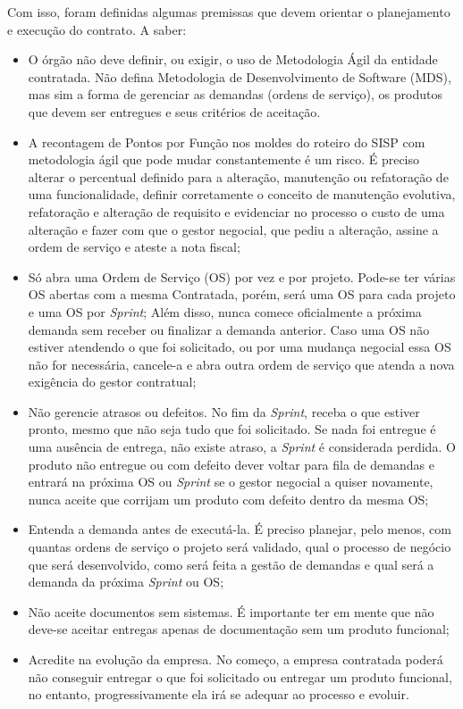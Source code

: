 Com isso, foram definidas algumas premissas que devem orientar o planejamento e execução do contrato. A saber: 
\begin{itemize}
\item O órgão não deve definir, ou exigir, o uso de Metodologia Ágil da entidade contratada. Não defina Metodologia de Desenvolvimento de Software (MDS), mas sim a
forma de gerenciar as demandas (ordens de serviço), os produtos que devem ser entregues e seus critérios de aceitação. 
\item A recontagem de Pontos por Função nos moldes do roteiro do SISP com metodologia ágil que pode mudar constantemente é um risco. É preciso alterar o percentual definido para a alteração, manutenção ou refatoração de uma funcionalidade, definir corretamente o conceito de manutenção evolutiva, refatoração e alteração de requisito e evidenciar no processo o custo de uma alteração e fazer com que o gestor negocial, que pediu a alteração, assine a ordem de serviço e ateste a nota fiscal;
\item Só abra uma Ordem de Serviço (OS) por vez e por projeto. Pode-se ter várias OS abertas com a mesma Contratada, porém, será uma OS para cada projeto e uma OS por \textit{Sprint}; Além disso, nunca comece oficialmente a próxima demanda sem receber ou finalizar a demanda anterior. Caso uma OS não estiver atendendo o que foi solicitado, ou por uma mudança negocial essa OS não for necessária, cancele-a e abra outra ordem de serviço que atenda a nova exigência do gestor contratual;
\item Não gerencie atrasos ou defeitos. No fim da \textit{Sprint}, receba o que estiver pronto, mesmo que não seja tudo que foi solicitado. Se nada foi entregue é uma ausência de entrega, não existe atraso, a \textit{Sprint} é considerada perdida. O produto não entregue ou com defeito dever voltar para fila de demandas e entrará na próxima OS ou \textit{Sprint} se o gestor negocial a quiser novamente, nunca aceite que corrijam um produto com defeito dentro da mesma OS;
\item Entenda a demanda antes de executá-la. É preciso planejar, pelo menos, com quantas ordens de serviço o projeto será validado, qual o processo de negócio que será desenvolvido, como será feita a gestão de demandas e qual será a demanda da próxima \textit{Sprint} ou OS;
\item Não aceite documentos sem sistemas. É importante ter em mente que não deve-se aceitar entregas apenas de documentação sem um produto funcional;
\item Acredite na evolução da empresa. No começo, a empresa contratada poderá não conseguir entregar o que foi solicitado ou entregar um produto funcional, no entanto, progressivamente ela irá se adequar ao processo e evoluir. 
\end{itemize} 

